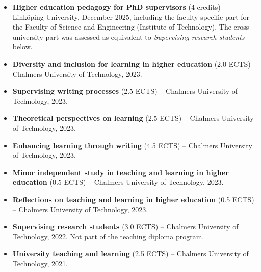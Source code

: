 \begin{itemize}[leftmargin=*,topsep=8pt,itemsep=0.85em]
    \item \textbf{Higher education pedagogy for PhD supervisors} (4 credits) --
    Linköping University, December 2025, including the faculty-specific part for
    the Faculty of Science and Engineering (Institute of Technology). The
    cross-university part was assessed as equivalent to \emph{Supervising
    research students} below.

    \item \textbf{Diversity and inclusion for learning in higher education}
    (2.0 ECTS) -- Chalmers University of Technology, 2023.

    \item \textbf{Supervising writing processes} (2.5 ECTS) -- Chalmers University of Technology, 2023.

    \item \textbf{Theoretical perspectives on learning} (2.5 ECTS) -- Chalmers University of Technology, 2023.

    \item \textbf{Enhancing learning through writing} (4.5 ECTS) -- Chalmers University of Technology, 2023.

    \item \textbf{Minor independent study in teaching and learning in higher
    education} (0.5 ECTS) -- Chalmers University of Technology, 2023.

    \item \textbf{Reflections on teaching and learning in higher education}
    (0.5 ECTS) -- Chalmers University of Technology, 2023.

    \item \textbf{Supervising research students} (3.0 ECTS) -- Chalmers
    University of Technology, 2022. Not part of the teaching diploma program.

    \item \textbf{University teaching and learning} (2.5 ECTS) -- Chalmers University of Technology, 2021.
\end{itemize}
